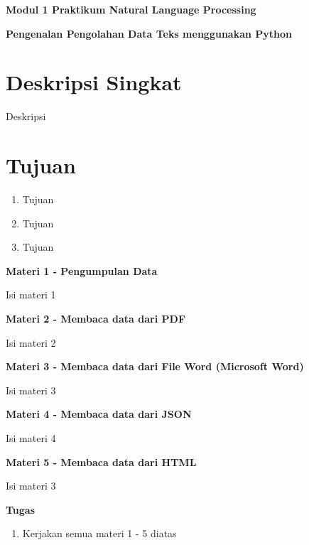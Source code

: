 \documentclass{article}
\begin{document}
    \begin{center}
        \textbf{Modul 1 Praktikum Natural Language Processing}

        \textbf{Pengenalan Pengolahan Data Teks menggunakan Python}
    \end{center}

    \section*{Deskripsi Singkat}
    Deskripsi

    \section*{Tujuan}
    \begin{enumerate}
        \item Tujuan
        \item Tujuan
        \item Tujuan
    \end{enumerate}

    \begin{flushleft}
        \textbf{Materi 1 - Pengumpulan Data}
        \newline

        Isi materi 1
    \end{flushleft}

    \begin{flushleft}
        \textbf{Materi 2 - Membaca data dari PDF}
        \newline

        Isi materi 2
    \end{flushleft}

    \begin{flushleft}
        \textbf{Materi 3 - Membaca data dari File Word (Microsoft Word)}
        \newline

        Isi materi 3
    \end{flushleft}

    \begin{flushleft}
        \textbf{Materi 4 - Membaca data dari JSON}
        \newline

        Isi materi 4
    \end{flushleft}

    \begin{flushleft}
        \textbf{Materi 5 - Membaca data dari HTML}
        \newline

        Isi materi 3
    \end{flushleft}

    \newpage
    \begin{flushleft}
        \textbf{Tugas}
        \newline

        \begin{enumerate}
            \item Kerjakan semua materi 1 - 5 diatas
        \end{enumerate}
    \end{flushleft}
\end{document}
